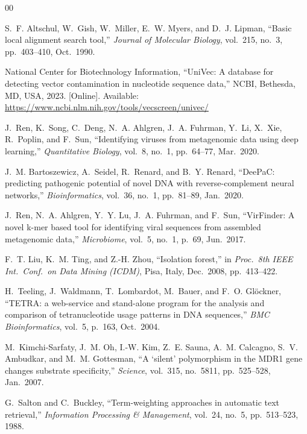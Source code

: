 \documentclass[conference]{IEEEtran}
\begin{document}
\begin{thebibliography}{00}

S.~F. Altschul, W.~Gish, W.~Miller, E.~W. Myers, and D.~J. Lipman,
``Basic local alignment search tool,''
\emph{Journal of Molecular Biology}, vol.~215, no.~3, pp.~403--410, Oct.\ 1990.

National Center for Biotechnology Information,
``UniVec: A database for detecting vector contamination in nucleotide sequence data,''
NCBI, Bethesda, MD, USA, 2023. [Online]. Available: \url{https://www.ncbi.nlm.nih.gov/tools/vecscreen/univec/}

J.~Ren, K.~Song, C.~Deng, N.~A. Ahlgren, J.~A. Fuhrman, Y.~Li, X.~Xie,
R.~Poplin, and F.~Sun,
``Identifying viruses from metagenomic data using deep learning,''
\emph{Quantitative Biology}, vol.~8, no.~1, pp.~64--77, Mar.\ 2020.

J.~M. Bartoszewicz, A.~Seidel, R.~Renard, and B.~Y. Renard,
``DeePaC: predicting pathogenic potential of novel DNA with
reverse-complement neural networks,''
\emph{Bioinformatics}, vol.~36, no.~1, pp.~81--89, Jan.\ 2020.

J.~Ren, N.~A. Ahlgren, Y.~Y. Lu, J.~A. Fuhrman, and F.~Sun,
``VirFinder: A novel k-mer based tool for identifying viral sequences
from assembled metagenomic data,''
\emph{Microbiome}, vol.~5, no.~1, p.~69, Jun.\ 2017.

F.~T. Liu, K.~M. Ting, and Z.-H. Zhou,
``Isolation forest,''
in \emph{Proc.\ 8th IEEE Int.\ Conf.\ on Data Mining (ICDM)},
Pisa, Italy, Dec.\ 2008, pp.~413--422.

H.~Teeling, J.~Waldmann, T.~Lombardot, M.~Bauer, and F.~O. Gl\"{o}ckner,
``TETRA: a web-service and stand-alone program for the analysis and
comparison of tetranucleotide usage patterns in DNA sequences,''
\emph{BMC Bioinformatics}, vol.~5, p.~163, Oct.\ 2004.

M.~Kimchi-Sarfaty, J.~M. Oh, I.-W. Kim, Z.~E. Sauna, A.~M. Calcagno,
S.~V. Ambudkar, and M.~M. Gottesman,
``A `silent' polymorphism in the MDR1 gene changes substrate specificity,''
\emph{Science}, vol.~315, no.~5811, pp.~525--528, Jan.\ 2007.

G.~Salton and C.~Buckley,
``Term-weighting approaches in automatic text retrieval,''
\emph{Information Processing \& Management}, vol.~24, no.~5,
pp.~513--523, 1988.


\end{thebibliography}
\end{document}
